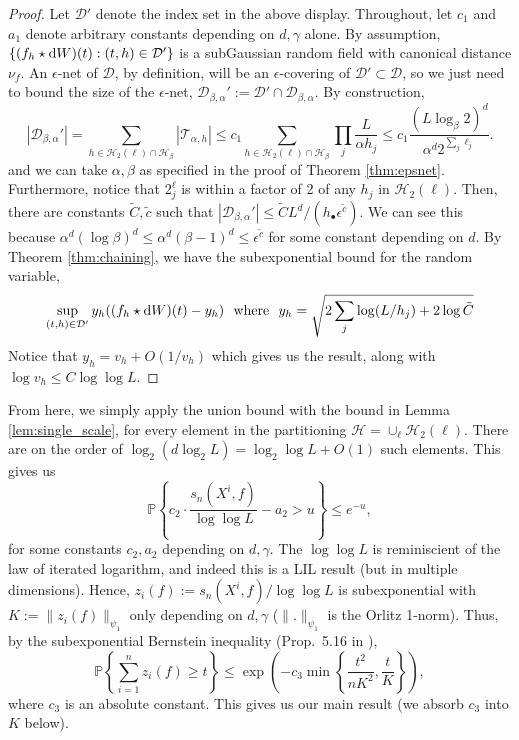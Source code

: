 \begin{proof}
Let $\mathcal D'$ denote the index set in the above display.
Throughout, let $c_1$ and $a_1$ denote arbitrary constants depending on $d,\gamma$ alone.
By assumption, $\{(f_h \star {\rm d} W)(t) : (t,h) \in \mathcal D'\}$ is a subGaussian random field with canonical distance $\nu_f$.  
An $\epsilon$-net of $\mathcal D$, by definition, will be an $\epsilon$-covering of $\mathcal D' \subset \mathcal D$, so we just need to bound the size of the $\epsilon$-net, $\mathcal D_{\beta,\alpha}' := \mathcal D' \cap \mathcal D_{\beta,\alpha}$.
By construction, 
$$
|\mathcal D_{\beta,\alpha}'| = \sum_{h \in \mathcal H_2(\ell) \cap \mathcal H_\beta} |\mathcal T_{\alpha,h}| \le c_1 \sum_{h \in \mathcal H_2(\ell) \cap \mathcal H_\beta} \prod_j \frac{L}{\alpha h_j} \le c_1 \frac{(L \log_\beta 2)^d}{\alpha^d 2^{\sum_j \ell_j}}.
$$
and we can take $\alpha, \beta$ as specified in the proof of Theorem \ref{thm:epsnet}.
Furthermore, notice that $2^\ell_j$ is within a factor of 2 of any $h_j$ in $\mathcal H_2(\ell)$.
Then, there are constants $\tilde C, \tilde c$ such that 
$
| \mathcal D_{\beta,\alpha}' | \le \tilde C L^d / (h_\bullet \epsilon^{\tilde c}).
$
We can see this because $\alpha^d (\log \beta)^d \le \alpha^d (\beta - 1)^d \le \epsilon^{\tilde c}$ for some constant depending on $d$.
By Theorem \ref{thm:chaining}, we have the subexponential bound for the random variable, 
$$\sup_{(t,h) \in \mathcal D'} y_h ((f_h \star {\rm d}W)(t) - y_h) {\rm ~~where~~}y_h = \sqrt{2 \sum_j \log (L/h_j) + 2\log \tilde C}$$
Notice that $y_h = v_h + O(1 / v_h)$ which gives us the result, along with $\log v_h \le C \log \log L$.
\end{proof}

From here, we simply apply the union bound with the bound in Lemma \ref{lem:single_scale}, for every element in the partitioning $\mathcal H = \cup_\ell \mathcal H_2(\ell)$.
There are on the order of $\log_2 (d \log_2 L) = \log_2 \log L + O(1)$ such elements.
This gives us 
$$
\mathbb P \left\{ c_2 \cdot \frac{s_n(X^i, f)}{\log \log L} - a_2 > u \right\} \le e^{-u},
$$
for some constants $c_2,a_2$ depending on $d,\gamma$.
The $\log \log L$ is reminiscient of the law of iterated logarithm, and indeed this is a LIL result (but in multiple dimensions).
Hence, $z_i(f) := s_n(X^i, f)/\log \log L$ is subexponential with $K := \| z_i(f) \|_{\psi_1}$ only depending on $d, \gamma$ ($\|. \|_{\psi_1}$ is the Orlitz 1-norm).
Thus, by the subexponential Bernstein inequality (Prop.~5.16 in \cite{vershynin2010introduction}),
$$
\mathbb P \left\{ \sum_{i=1}^n z_i(f) \ge t \right\} \le \exp\left( -c_3 \min\left\{ \frac{t^2}{n K^2}, \frac{t}{K} \right\} \right),  
$$
where $c_3$ is an absolute constant.
This gives us our main result (we absorb $c_3$ into $K$ below).

